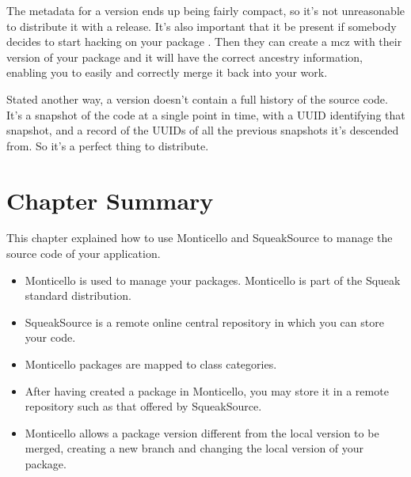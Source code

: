 \documentclass[a4paper,10pt,twoside]{book}
\begin{document}
The metadata for a version ends up being fairly compact, so it's not unreasonable to distribute it with a release.  It's also important that it be present if somebody decides to start hacking on your package . Then they can create a mcz with their version of your package and it will have the correct ancestry information, enabling you to easily and correctly merge it back into your work.

Stated another way, a version doesn't contain a full history of the source code. It's a snapshot of the code at a single point in time, with a UUID identifying that snapshot, and a record of the UUIDs of all the previous snapshots it's descended from. So it's a perfect thing to distribute. 

\section{Chapter Summary}

This chapter explained how to use Monticello and SqueakSource to manage the source code of your application.

\begin{itemize}
\item Monticello is used to manage your packages. Monticello is part of the Squeak standard distribution.

\item SqueakSource is a remote online central repository in which you can store your code.

\item Monticello packages are mapped to class categories. 

\item After having created a package in Monticello, you may store it in a remote repository such as that offered by SqueakSource.

\item Monticello allows a package version different from the local version to be merged, creating a new branch and changing the local version of your package.
\end{itemize}


\end{document}
